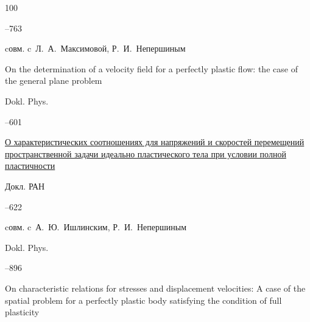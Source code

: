 \begin{thebibliography}{100}



–763


\miscnote cовм. c~Л.~А.~Максимовой, Р.~И.~Непершиным

\transl

\paper On the determination of a velocity field for a perfectly plastic flow: the case of the general plane problem

\jour Dokl. Phys.




--601






\paper \href{http://mi.mathnet.ru/dan2283}{О характеристических соотношениях для напряжений и скоростей перемещений пространственной задачи идеально пластического тела при условии полной пластичности}

\jour Докл. РАН




--622

\miscnote cовм. c~А.~Ю.~Ишлинским, Р.~И.~Непершиным



\transl

\jour Dokl. Phys.




--896

\paper On characteristic relations for stresses and displacement velocities: A case of the spatial problem for a perfectly plastic body satisfying the condition of full plasticity










\end{thebibliography}
